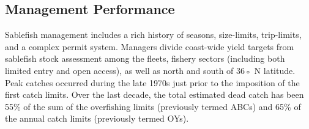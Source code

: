 \documentclass[11pt,
  english,
  a4paper,
]{article}
\begin{document}
\tagmcend\tagstructend


\hypertarget{management-performance}{%
\subsection*{Management Performance}\label{management-performance}}

\leavevmode\tagmcend\tagstructend


Sablefish management includes a rich history of seasons, size-limits, trip-limits, and a complex permit system. Managers divide coast-wide yield targets from sablefish stock assessment among the fleets, fishery sectors (including both limited entry and open access), as well as north and south of 36◦ N latitude. Peak catches occurred during the late 1970s just prior to the imposition of the first catch limits. Over the last decade, the total estimated dead catch has been 55\% of the sum of the overfishing limits (previously termed ABCs) and 65\% of the annual catch limits (previously termed OYs).

\leavevmode\tagmcend\tagstructend\par

\begingroup\fontsize{10}{12}\selectfont
\begingroup\fontsize{10}{12}\selectfont
\end{document}
